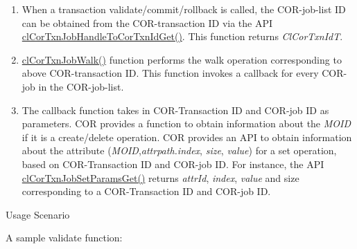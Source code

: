 \begin{enumerate}
\item When a transaction validate/commit/rollback is called, the COR-job-list ID can be obtained from the COR-transaction ID via the API \hyperlink{group__group13_ga70}{cl\-Cor\-Txn\-Job\-Handle\-To\-Cor\-Txn\-Id\-Get()}. This function returns {\em Cl\-Cor\-Txn\-Id\-T\/}.\item \hyperlink{group__group13_ga66}{cl\-Cor\-Txn\-Job\-Walk()} function performs the walk operation corresponding to above COR-transaction ID. This function invokes a callback for every COR-job in the COR-job-list.\item The callback function takes in COR-Transaction ID and COR-job ID as parameters. COR provides a function to obtain information about the {\em MOID\/} if it is a create/delete operation. COR provides an API to obtain information about the attribute ({\em MOID\/},{\em attrpath.index\/}, {\em size\/}, {\em value\/}) for a set operation, based on COR-Transaction ID and COR-job ID. For instance, the API \hyperlink{group__group13_ga73}{cl\-Cor\-Txn\-Job\-Set\-Params\-Get()} returns {\em attr\-Id\/}, {\em index\/}, {\em value\/} and size corresponding to a COR-Transaction ID and COR-job ID.\end{enumerate}


\begin{Desc}
\item[Usage Scenario]\end{Desc}
A sample validate function: 

